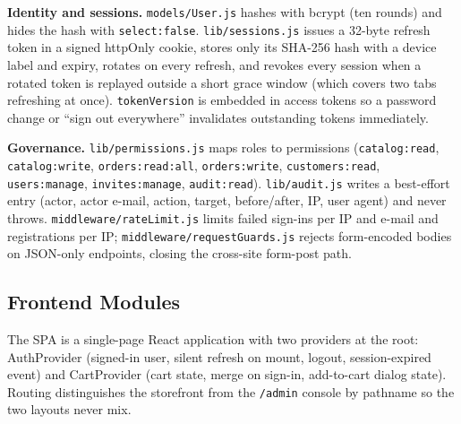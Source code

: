 \documentclass[11pt,a4paper]{article}
\begin{document}
\noindent\textbf{Identity and sessions.} \texttt{models/User.js} hashes with bcrypt (ten
rounds) and hides the hash with \texttt{select:false}. \texttt{lib/sessions.js} issues a
32-byte refresh token in a signed httpOnly cookie, stores only its SHA-256 hash with a
device label and expiry, rotates on every refresh, and revokes every session when a
rotated token is replayed outside a short grace window (which covers two tabs refreshing
at once). \texttt{tokenVersion} is embedded in access tokens so a password change or
``sign out everywhere'' invalidates outstanding tokens immediately.

\noindent\textbf{Governance.} \texttt{lib/permissions.js} maps roles to permissions
(\texttt{catalog:read}, \texttt{catalog:write}, \texttt{orders:read:all},
\texttt{orders:write}, \texttt{customers:read}, \texttt{users:manage},
\texttt{invites:manage}, \texttt{audit:read}). \texttt{lib/audit.js} writes a
best-effort entry (actor, actor e-mail, action, target, before/after, IP, user agent) and
never throws. \texttt{middleware/rateLimit.js} limits failed sign-ins per IP and e-mail
and registrations per IP; \texttt{middleware/requestGuards.js} rejects form-encoded
bodies on JSON-only endpoints, closing the cross-site form-post path.

\subsection{Frontend Modules}
The SPA is a single-page React application with two providers at the root: AuthProvider
(signed-in user, silent refresh on mount, logout, session-expired event) and CartProvider
(cart state, merge on sign-in, add-to-cart dialog state). Routing distinguishes the
storefront from the \texttt{/admin} console by pathname so the two layouts never mix.
\end{document}
